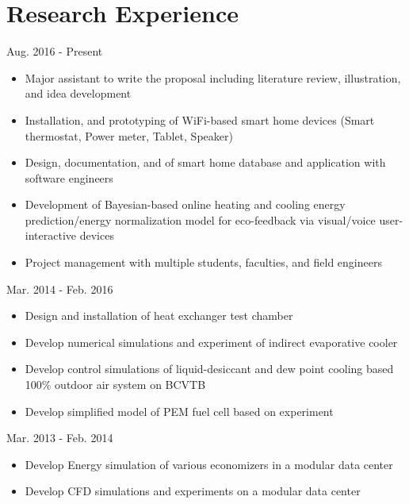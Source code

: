 \documentclass{resume}
\begin{document}
\section{Research Experience}
 {\hfill   Aug. 2016 - Present}
\begin{itemize}
\item{Major assistant to write the proposal including literature review, illustration, and idea development}
\item{Installation, and prototyping of WiFi-based smart home devices (Smart thermostat, Power meter, Tablet, Speaker)}
\item{Design, documentation, and of smart home database and application with software engineers}
\item{Development of Bayesian-based online heating and cooling energy prediction/energy normalization model for eco-feedback via visual/voice user-interactive devices}
\item{Project management with multiple students, faculties, and field engineers}
\end{itemize}
 {\hfill   Mar. 2014 - Feb. 2016}
\begin{itemize}
\item{Design and installation of heat exchanger test chamber}
\item{Develop numerical simulations and experiment of indirect evaporative cooler}
\item{Develop control simulations of liquid-desiccant and dew point cooling based 100\% outdoor air system on BCVTB}
\item{Develop simplified model of PEM fuel cell based on experiment}
\end{itemize}
 {\hfill   Mar. 2013 - Feb. 2014}
\begin{itemize}
\item{Develop Energy simulation of various economizers in a modular data center}
\item{Develop CFD simulations and experiments on a modular data center}
\end{itemize}
\end{document}
